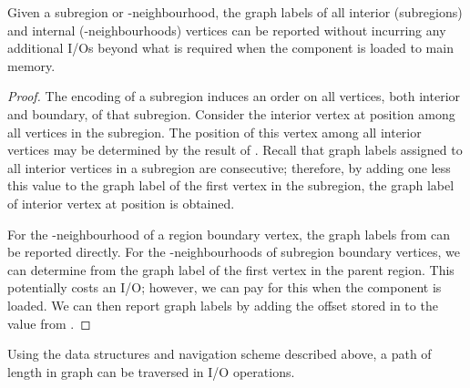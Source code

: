 \begin{lemma}
  \label{lem:report_int_labels}
  Given a subregion or -neighbourhood, the graph labels of
  all interior (subregions) and internal (-neighbourhoods)
  vertices can be reported without incurring any additional I/Os
  beyond what is required when the component is loaded to main memory.
\end{lemma}


\begin{proof}
  The encoding of a subregion induces an order on all vertices, both
  interior and boundary, of that subregion. Consider the interior
  vertex at position  among all vertices in the subregion. 
  The position of this vertex among all interior vertices may be
  determined by the result of . 
  Recall that graph labels assigned to all interior vertices in a subregion are
  consecutive; therefore, by adding one less this value to the
  graph label of the first vertex in the subregion, the graph label
  of interior vertex at position  is obtained.

  For the -neighbourhood of a region boundary vertex, the graph
  labels from  can be reported directly.  
  For the -neighbourhoods of subregion boundary vertices, we can
  determine from  the graph label of the first vertex
  in the parent region. 
  This potentially costs an I/O; however, we can pay for this when the 
component is loaded. 
  We can then report graph
  labels by adding the offset stored in  to the
  value from .
\end{proof}

\begin{lemma}
  \label{lem:main_IO_bound}
  Using the data structures and navigation scheme described above, a
  path of length  in graph  can be traversed in  I/O operations.
\end{lemma}

